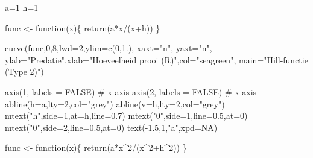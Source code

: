 \documentclass[
  a4paper,
]{scrbook}
\newenvironment{Shaded}{\begin{snugshade}}{\end{snugshade}}
\newcommand{\AttributeTok}[1]{\textcolor[rgb]{0.40,0.45,0.13}{#1}}
\newcommand{\CommentTok}[1]{\textcolor[rgb]{0.37,0.37,0.37}{#1}}
\newcommand{\ConstantTok}[1]{\textcolor[rgb]{0.56,0.35,0.01}{#1}}
\newcommand{\ControlFlowTok}[1]{\textcolor[rgb]{0.00,0.23,0.31}{#1}}
\newcommand{\DecValTok}[1]{\textcolor[rgb]{0.68,0.00,0.00}{#1}}
\newcommand{\FloatTok}[1]{\textcolor[rgb]{0.68,0.00,0.00}{#1}}
\newcommand{\FunctionTok}[1]{\textcolor[rgb]{0.28,0.35,0.67}{#1}}
\newcommand{\NormalTok}[1]{\textcolor[rgb]{0.00,0.23,0.31}{#1}}
\newcommand{\OtherTok}[1]{\textcolor[rgb]{0.00,0.23,0.31}{#1}}
\newcommand{\SpecialCharTok}[1]{\textcolor[rgb]{0.37,0.37,0.37}{#1}}
\newcommand{\StringTok}[1]{\textcolor[rgb]{0.13,0.47,0.30}{#1}}
\theoremstyle{definition}
\theoremstyle{remark}
\begin{document}
\begin{Shaded}
\begin{Highlighting}[]
\NormalTok{a}\OtherTok{=}\DecValTok{1}
\NormalTok{h}\OtherTok{=}\DecValTok{1}

\NormalTok{func }\OtherTok{\textless{}{-}} \ControlFlowTok{function}\NormalTok{(x)\{}
  \FunctionTok{return}\NormalTok{(a}\SpecialCharTok{*}\NormalTok{x}\SpecialCharTok{/}\NormalTok{(x}\SpecialCharTok{+}\NormalTok{h))}
\NormalTok{\}}

\FunctionTok{curve}\NormalTok{(func,}\DecValTok{0}\NormalTok{,}\DecValTok{8}\NormalTok{,}\AttributeTok{lwd=}\DecValTok{2}\NormalTok{,}\AttributeTok{ylim=}\FunctionTok{c}\NormalTok{(}\DecValTok{0}\NormalTok{,}\FloatTok{1.}\NormalTok{), }\AttributeTok{xaxt=}\StringTok{"n"}\NormalTok{, }\AttributeTok{yaxt=}\StringTok{"n"}\NormalTok{,}
      \AttributeTok{ylab=}\StringTok{"Predatie"}\NormalTok{,}\AttributeTok{xlab=}\StringTok{"Hoeveelheid prooi (R)"}\NormalTok{,}\AttributeTok{col=}\StringTok{"seagreen"}\NormalTok{,}
      \AttributeTok{main=}\StringTok{"Hill{-}functie (Type 2)"}\NormalTok{)}

\FunctionTok{axis}\NormalTok{(}\DecValTok{1}\NormalTok{, }\AttributeTok{labels =} \ConstantTok{FALSE}\NormalTok{) }\CommentTok{\# x{-}axis}
\FunctionTok{axis}\NormalTok{(}\DecValTok{2}\NormalTok{, }\AttributeTok{labels =} \ConstantTok{FALSE}\NormalTok{) }\CommentTok{\# x{-}axis}
\FunctionTok{abline}\NormalTok{(}\AttributeTok{h=}\NormalTok{a,}\AttributeTok{lty=}\DecValTok{2}\NormalTok{,}\AttributeTok{col=}\StringTok{"grey"}\NormalTok{)}
\FunctionTok{abline}\NormalTok{(}\AttributeTok{v=}\NormalTok{h,}\AttributeTok{lty=}\DecValTok{2}\NormalTok{,}\AttributeTok{col=}\StringTok{"grey"}\NormalTok{)}
\FunctionTok{mtext}\NormalTok{(}\StringTok{"h"}\NormalTok{,}\AttributeTok{side=}\DecValTok{1}\NormalTok{,}\AttributeTok{at=}\NormalTok{h,}\AttributeTok{line=}\FloatTok{0.7}\NormalTok{)}
\FunctionTok{mtext}\NormalTok{(}\StringTok{"0"}\NormalTok{,}\AttributeTok{side=}\DecValTok{1}\NormalTok{,}\AttributeTok{line=}\FloatTok{0.5}\NormalTok{,}\AttributeTok{at=}\DecValTok{0}\NormalTok{)}
\FunctionTok{mtext}\NormalTok{(}\StringTok{"0"}\NormalTok{,}\AttributeTok{side=}\DecValTok{2}\NormalTok{,}\AttributeTok{line=}\FloatTok{0.5}\NormalTok{,}\AttributeTok{at=}\DecValTok{0}\NormalTok{)}
\FunctionTok{text}\NormalTok{(}\SpecialCharTok{{-}}\FloatTok{1.5}\NormalTok{,}\DecValTok{1}\NormalTok{,}\StringTok{"a"}\NormalTok{,}\AttributeTok{xpd=}\ConstantTok{NA}\NormalTok{)}

\NormalTok{func }\OtherTok{\textless{}{-}} \ControlFlowTok{function}\NormalTok{(x)\{}
  \FunctionTok{return}\NormalTok{(a}\SpecialCharTok{*}\NormalTok{x}\SpecialCharTok{\^{}}\DecValTok{2}\SpecialCharTok{/}\NormalTok{(x}\SpecialCharTok{\^{}}\DecValTok{2}\SpecialCharTok{+}\NormalTok{h}\SpecialCharTok{\^{}}\DecValTok{2}\NormalTok{))}
\NormalTok{\}}


\end{Highlighting}
\end{Shaded}
\end{document}
